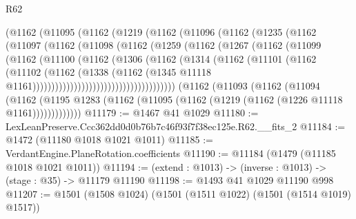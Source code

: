\begin{lexlean}{R62}
\begin{coremodule}
                  (@1162
                    (@11095
                      (@1162
                        (@1219
                          (@1162
                            (@11096
                              (@1162
                                (@1235
                                  (@1162
                                    (@11097
                                      (@1162
                                        (@11098
                                          (@1162
                                            (@1259
                                              (@1162
                                                (@1267
                                                  (@1162
                                                    (@11099
                                                      (@1162
                                                        (@11100
                                                          (@1162
                                                            (@1306
                                                              (@1162
                                                                (@1314
                                                                  (@1162
                                                                    (@11101
                                                                      (@1162
                                                                        (@11102
                                                                          (@1162
                                                                            (@1338
                                                                              (@1162
                                                                                (@1345
                                                                                  @11118
                                                                                  @1161))))))))))))))))))))))))))))))))))))))
      (@1162
        (@11093
          (@1162
            (@11094
              (@1162
                (@1195 @1283 (@1162 (@11095 (@1162 (@1219 (@1162 (@1226 @11118 @1161)))))))))))))
@11179 := @1467 @41 @1029
@11180 := LexLeanPreserve.Ccc362dd0d0b76b7c46f93f7f38ec125e.R62.__fits_2
@11184 := @1472 (@11180 @1018 @1021 @1011)
@11185 := VerdantEngine.PlaneRotation.coefficients
@11190 := @11184 (@1479 (@11185 @1018 @1021 @1011))
@11194 := (extend : @1013) -> (inverse : @1013) -> (stage : @35) -> @11179 @11190
@11198 := @1493 @41 @1029 @11190 @998
@11207 := @1501 (@1508 @1024) (@1501 (@1511 @1022) (@1501 (@1514 @1019) @1517))

\end{coremodule}
\end{lexlean}
